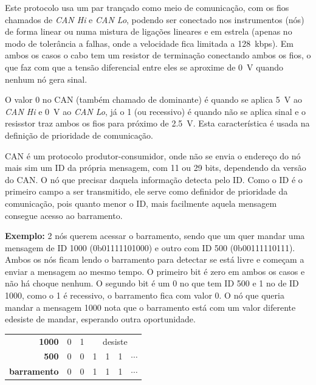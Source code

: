 Este protocolo usa um par trançado como meio de comunicação, com os fios chamados de \emph{CAN Hi} e \emph{CAN Lo}, podendo ser conectado nos instrumentos (nós) de forma linear ou numa mistura de ligações lineares e em estrela (apenas no modo de tolerância a falhas, onde a velocidade fica limitada a \SI{128}{kbps}). Em ambos os casos o cabo tem um resistor de terminação conectando ambos os fios, o que faz com que a tensão diferencial entre eles se aproxime de \SI{0}{V} quando nenhum nó gera sinal.

O valor 0 no CAN (também chamado de dominante) é quando se aplica \SI{5}{V} ao \emph{CAN Hi} e \SI{0}{V} ao \emph{CAN Lo}, já o 1 (ou recessivo) é quando não se aplica sinal e o resisstor traz ambos os fios para próximo de \SI{2,5}{V}. Esta característica é usada na definição de prioridade de comunicação.

CAN é um protocolo produtor-consumidor, onde não se envia o endereço do nó mais sim um ID da própria mensagem, com 11 ou 29 bits, dependendo da versão do CAN. O nó que precisar daquela informação detecta pelo ID. Como o ID é o primeiro campo a ser transmitido, ele serve como definidor de prioridade da comunicação, pois quanto menor o ID, mais facilmente aquela mensagem consegue acesso ao barramento.

\textbf{Exemplo:} 2 nós querem acessar o barramento, sendo que um quer mandar uma mensagem de ID 1000
(0b01111101000) e outro com ID 500 (0b00111110111). Ambos os nós ficam lendo o barramento para detectar se está livre e começam a enviar a mensagem ao mesmo tempo. O primeiro bit é zero em ambos os casos e não há choque nenhum. O segundo bit é um 0 no que tem ID 500 e 1 no de ID 1000, como o 1 é recessivo, o barramento fica com valor 0. O nó que queria mandar a mensagem 1000 nota que o barramento está com um valor diferente edesiste de mandar, esperando outra oportunidade.

\begin{center}
\begin{tabular}{r|cccccc}
    \textbf{1000}       & \cellcolor{blue!25}0 & \cellcolor{red!25}1 & \multicolumn{4}{c}{\cellcolor{gray!25}desiste} \\
    \textbf{500}        & \cellcolor{blue!25}0 & \cellcolor{blue!25}0 & \cellcolor{red!25}1   & \cellcolor{red!25}1   & \cellcolor{red!25}1   & $\cdots$  \\
    \textbf{barramento} & \cellcolor{blue!25}0 & \cellcolor{blue!25}0 & \cellcolor{red!25}1   & \cellcolor{red!25}1   & \cellcolor{red!25}1   & $\cdots$ 
\end{tabular}
\end{center}


